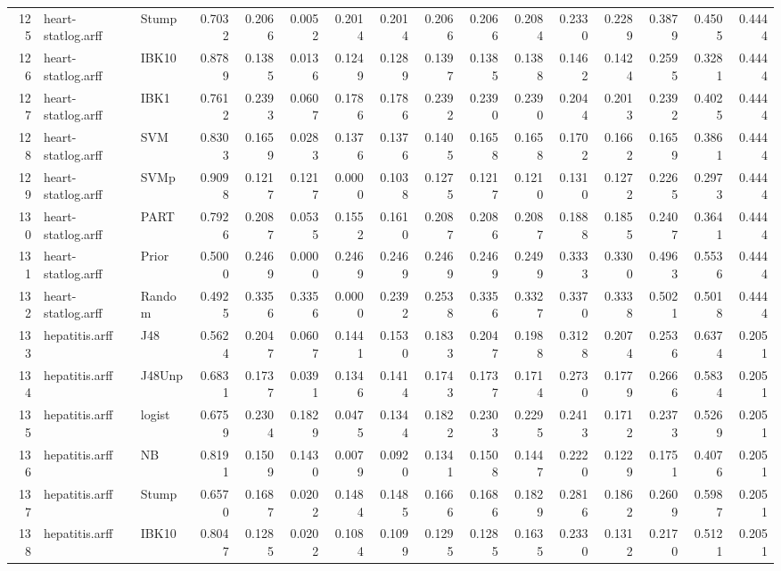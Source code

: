 \documentclass {article}
\begin{document}
\begin{table}[ht]
\begin{tabular}{rllrrrrrrrrrrrrr}
  125 & heart-statlog.arff & Stump & 0.7032 & 0.2066 & 0.0052 & 0.2014 & 0.2014 & 0.2066 & 0.2066 & 0.2084 & 0.2330 & 0.2289 & 0.3879 & 0.4505 & 0.4444 \\ 
  126 & heart-statlog.arff & IBK10 & 0.8789 & 0.1385 & 0.0136 & 0.1249 & 0.1289 & 0.1397 & 0.1385 & 0.1388 & 0.1462 & 0.1424 & 0.2595 & 0.3281 & 0.4444 \\ 
  127 & heart-statlog.arff & IBK1 & 0.7612 & 0.2393 & 0.0607 & 0.1786 & 0.1786 & 0.2392 & 0.2390 & 0.2390 & 0.2044 & 0.2013 & 0.2392 & 0.4025 & 0.4444 \\ 
  128 & heart-statlog.arff & SVM & 0.8303 & 0.1659 & 0.0283 & 0.1376 & 0.1376 & 0.1405 & 0.1658 & 0.1658 & 0.1702 & 0.1662 & 0.1659 & 0.3861 & 0.4444 \\ 
  129 & heart-statlog.arff & SVMp & 0.9098 & 0.1217 & 0.1217 & 0.0000 & 0.1038 & 0.1275 & 0.1217 & 0.1210 & 0.1310 & 0.1272 & 0.2265 & 0.2973 & 0.4444 \\ 
  130 & heart-statlog.arff & PART & 0.7926 & 0.2087 & 0.0535 & 0.1552 & 0.1610 & 0.2087 & 0.2086 & 0.2087 & 0.1888 & 0.1855 & 0.2407 & 0.3641 & 0.4444 \\ 
  131 & heart-statlog.arff & Prior & 0.5000 & 0.2469 & 0.0000 & 0.2469 & 0.2469 & 0.2469 & 0.2469 & 0.2499 & 0.3333 & 0.3300 & 0.4963 & 0.5536 & 0.4444 \\ 
  132 & heart-statlog.arff & Random & 0.4925 & 0.3356 & 0.3356 & 0.0000 & 0.2392 & 0.2538 & 0.3356 & 0.3327 & 0.3370 & 0.3338 & 0.5021 & 0.5018 & 0.4444 \\ 
  133 & hepatitis.arff & J48 & 0.5624 & 0.2047 & 0.0607 & 0.1441 & 0.1530 & 0.1833 & 0.2047 & 0.1988 & 0.3128 & 0.2074 & 0.2536 & 0.6374 & 0.2051 \\ 
  134 & hepatitis.arff & J48Unp & 0.6831 & 0.1737 & 0.0391 & 0.1346 & 0.1414 & 0.1743 & 0.1737 & 0.1714 & 0.2730 & 0.1779 & 0.2666 & 0.5834 & 0.2051 \\ 
  135 & hepatitis.arff & logist & 0.6759 & 0.2304 & 0.1829 & 0.0475 & 0.1344 & 0.1822 & 0.2303 & 0.2295 & 0.2413 & 0.1712 & 0.2373 & 0.5269 & 0.2051 \\ 
  136 & hepatitis.arff & NB & 0.8191 & 0.1509 & 0.1430 & 0.0079 & 0.0920 & 0.1341 & 0.1508 & 0.1447 & 0.2220 & 0.1229 & 0.1751 & 0.4076 & 0.2051 \\ 
  137 & hepatitis.arff & Stump & 0.6570 & 0.1687 & 0.0202 & 0.1484 & 0.1485 & 0.1666 & 0.1686 & 0.1829 & 0.2816 & 0.1862 & 0.2609 & 0.5987 & 0.2051 \\ 
  138 & hepatitis.arff & IBK10 & 0.8047 & 0.1285 & 0.0202 & 0.1084 & 0.1099 & 0.1295 & 0.1285 & 0.1635 & 0.2330 & 0.1312 & 0.2170 & 0.5121 & 0.2051 \\ 

\end{tabular}
\end{table}
\end{document}
